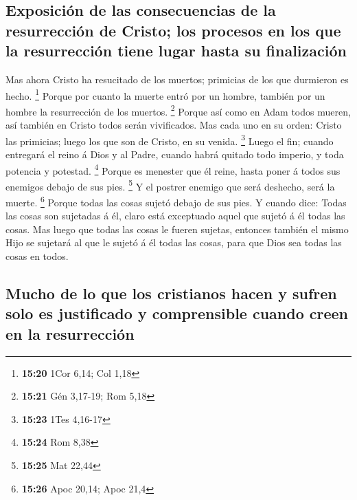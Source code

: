\hypertarget{exposiciuxf3n-de-las-consecuencias-de-la-resurrecciuxf3n-de-cristo-los-procesos-en-los-que-la-resurrecciuxf3n-tiene-lugar-hasta-su-finalizaciuxf3n}{%
\subsection{Exposición de las consecuencias de la resurrección de
Cristo; los procesos en los que la resurrección tiene lugar hasta su
finalización}\label{exposiciuxf3n-de-las-consecuencias-de-la-resurrecciuxf3n-de-cristo-los-procesos-en-los-que-la-resurrecciuxf3n-tiene-lugar-hasta-su-finalizaciuxf3n}}

 Mas ahora Cristo ha resucitado de los muertos; primicias
de los que durmieron es hecho. \footnote{\textbf{15:20} 1Cor 6,14; Col
  1,18}  Porque por cuanto la muerte entró por un hombre,
también por un hombre la resurrección de los muertos. \footnote{\textbf{15:21}
  Gén 3,17-19; Rom 5,18}  Porque así como en Adam todos
mueren, así también en Cristo todos serán vivificados.  Mas
cada uno en su orden: Cristo las primicias; luego los que son de Cristo,
en su venida. \footnote{\textbf{15:23} 1Tes 4,16-17}  Luego
el fin; cuando entregará el reino á Dios y al Padre, cuando habrá
quitado todo imperio, y toda potencia y potestad. \footnote{\textbf{15:24}
  Rom 8,38}  Porque es menester que él reine, hasta poner á
todos sus enemigos debajo de sus pies. \footnote{\textbf{15:25} Mat
  22,44}  Y el postrer enemigo que será deshecho, será la
muerte. \footnote{\textbf{15:26} Apoc 20,14; Apoc 21,4} 
Porque todas las cosas sujetó debajo de sus pies. Y cuando dice: Todas
las cosas son sujetadas á él, claro está exceptuado aquel que sujetó á
él todas las cosas.  Mas luego que todas las cosas le
fueren sujetas, entonces también el mismo Hijo se sujetará al que le
sujetó á él todas las cosas, para que Dios sea todas las cosas en todos.

\hypertarget{mucho-de-lo-que-los-cristianos-hacen-y-sufren-solo-es-justificado-y-comprensible-cuando-creen-en-la-resurrecciuxf3n}{%
\subsection{Mucho de lo que los cristianos hacen y sufren solo es
justificado y comprensible cuando creen en la
resurrección}\label{mucho-de-lo-que-los-cristianos-hacen-y-sufren-solo-es-justificado-y-comprensible-cuando-creen-en-la-resurrecciuxf3n}}

